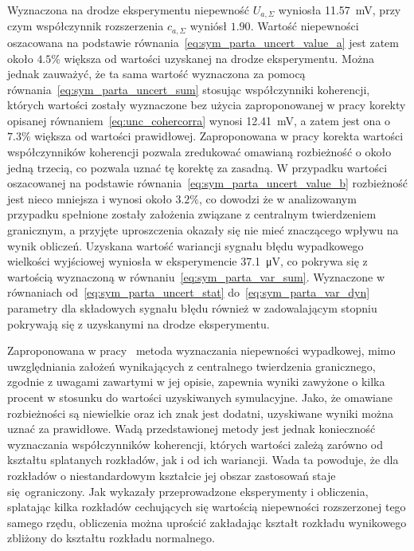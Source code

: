 Wyznaczona na drodze eksperymentu niepewność $U_{a,\Sigma}$ wyniosła \qty{11.57}{mV}, przy czym współczynnik rozszerzenia $c_{a,\Sigma}$ wyniósł $1.90$. Wartość niepewności oszacowana na podstawie równania~\eqref{eq:sym_parta_uncert_value_a} jest zatem około $4.5\%$ większa od wartości uzyskanej na drodze eksperymentu. Można jednak zauważyć, że ta sama wartość wyznaczona za pomocą równania~\eqref{eq:sym_parta_uncert_sum} stosując współczynniki koherencji, których wartości zostały wyznaczone bez użycia zaproponowanej w pracy korekty opisanej równaniem~\eqref{eq:unc_cohercorra} wynosi \qty{12.41}{mV}, a zatem jest ona o $7.3\%$ większa od wartości prawidłowej. Zaproponowana w pracy korekta wartości współczynników koherencji pozwala zredukować omawianą rozbieżność o około jedną trzecią, co pozwala uznać tę korektę za zasadną. W przypadku wartości oszacowanej na podstawie równania~\eqref{eq:sym_parta_uncert_value_b} rozbieżność jest nieco mniejsza i wynosi około $3.2\%$, co dowodzi że w analizowanym przypadku spełnione zostały założenia związane z centralnym twierdzeniem granicznym, a przyjęte uproszczenia okazały się nie mieć znaczącego wpływu na wynik obliczeń. Uzyskana wartość wariancji sygnału błędu wypadkowego wielkości wyjściowej wyniosła w eksperymencie \qty{37.1}{\micro V}, co pokrywa się z wartością wyznaczoną w równaniu~\eqref{eq:sym_parta_var_sum}. Wyznaczone w równaniach od~\eqref{eq:sym_parta_uncert_stat} do~\eqref{eq:sym_parta_var_dyn} parametry dla składowych sygnału błędu również w zadowalającym stopniu pokrywają się z uzyskanymi na drodze eksperymentu.

Zaproponowana w pracy~\cite{jakubiec_system} metoda wyznaczania niepewności wypadkowej, mimo uwzględniania założeń wynikających z centralnego twierdzenia granicznego, zgodnie z uwagami zawartymi w jej opisie, zapewnia wyniki zawyżone o kilka procent w stosunku do wartości uzyskiwanych symulacyjne. Jako, że omawiane rozbieżności są niewielkie oraz ich znak jest dodatni, uzyskiwane wyniki można uznać za prawidłowe. Wadą przedstawionej metody jest jednak konieczność wyznaczania współczynników koherencji, których wartości zależą zarówno od kształtu splatanych rozkładów, jak i od ich wariancji. Wada ta powoduje, że dla rozkładów o niestandardowym kształcie jej obszar zastosowań staje się ograniczony. Jak wykazały przeprowadzone eksperymenty i obliczenia, splatając kilka rozkładów cechujących się wartością niepewności rozszerzonej tego samego rzędu, obliczenia można uprościć zakładając kształt rozkładu wynikowego zbliżony do kształtu rozkładu normalnego.

